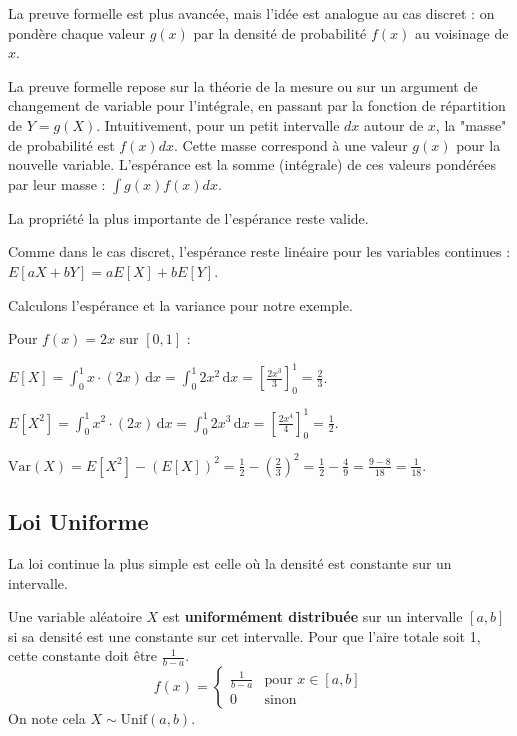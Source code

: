 La preuve formelle est plus avancée, mais l'idée est analogue au cas discret : on pondère chaque valeur $g(x)$ par la densité de probabilité $f(x)$ au voisinage de $x$.

\begin{proofbox}
La preuve formelle repose sur la théorie de la mesure ou sur un argument de changement de variable pour l'intégrale, en passant par la fonction de répartition de $Y=g(X)$. Intuitivement, pour un petit intervalle $dx$ autour de $x$, la "masse" de probabilité est $f(x)dx$. Cette masse correspond à une valeur $g(x)$ pour la nouvelle variable. L'espérance est la somme (intégrale) de ces valeurs pondérées par leur masse : $\int g(x) f(x)dx$.
\end{proofbox}

La propriété la plus importante de l'espérance reste valide.

\begin{remarquebox}
Comme dans le cas discret, l'espérance reste linéaire pour les variables continues :
$E[aX+bY] = aE[X]+bE[Y]$.
\end{remarquebox}

Calculons l'espérance et la variance pour notre exemple.

\begin{examplebox}
Pour $f(x) = 2x$ sur $[0, 1]$ :

$E[X] = \int_0^1 x \cdot (2x) \, \mathrm{d}x = \int_0^1 2x^2 \, \mathrm{d}x = \left[ \frac{2x^3}{3} \right]_0^1 = \frac{2}{3}$.

$E[X^2] = \int_0^1 x^2 \cdot (2x) \, \mathrm{d}x = \int_0^1 2x^3 \, \mathrm{d}x = \left[ \frac{2x^4}{4} \right]_0^1 = \frac{1}{2}$.

$\text{Var}(X) = E[X^2] - (E[X])^2 = \frac{1}{2} - \left(\frac{2}{3}\right)^2 = \frac{1}{2} - \frac{4}{9} = \frac{9-8}{18} = \frac{1}{18}$.
\end{examplebox}

\subsection{Loi Uniforme}

La loi continue la plus simple est celle où la densité est constante sur un intervalle.

\begin{definitionbox}
Une variable aléatoire $X$ est \textbf{uniformément distribuée} sur un intervalle $[a, b]$ si sa densité est une constante sur cet intervalle. Pour que l'aire totale soit 1, cette constante doit être $\frac{1}{b-a}$.
$$ f(x) = \begin{cases} \frac{1}{b-a} & \text{pour } x \in [a, b] \\ 0 & \text{sinon} \end{cases} $$
On note cela $X \sim \text{Unif}(a, b)$.
\end{definitionbox}

